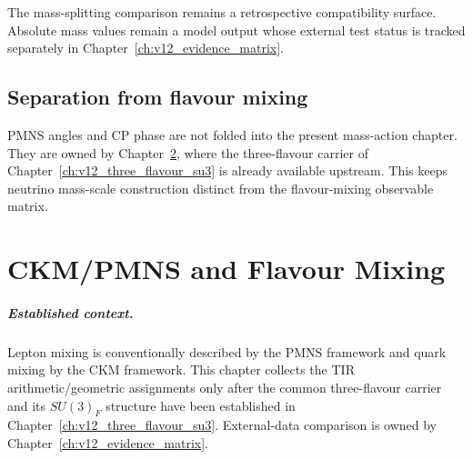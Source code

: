 The mass-splitting comparison remains a retrospective compatibility surface.
Absolute mass values remain a model output whose external test status is tracked
separately in Chapter~\ref{ch:v12_evidence_matrix}.

\section{Separation from flavour mixing}
PMNS angles and CP phase are not folded into the present mass-action chapter.
They are owned by Chapter~\ref{ch:v12_ckm_pmns}, where the three-flavour carrier
of Chapter~\ref{ch:v12_three_flavour_su3} is already available upstream. This
keeps neutrino mass-scale construction distinct from the flavour-mixing
observable matrix.

\clearpage

\chapter{CKM/PMNS and Flavour Mixing}
\label{ch:v12_ckm_pmns}

\paragraph{Established context.}
Lepton mixing is conventionally described by the PMNS framework and quark
mixing by the CKM framework.  This chapter collects the TIR arithmetic/geometric
assignments only after the common three-flavour carrier and its $SU(3)_F$
structure have been established in Chapter~\ref{ch:v12_three_flavour_su3}.
External-data comparison is owned by Chapter~\ref{ch:v12_evidence_matrix}.


